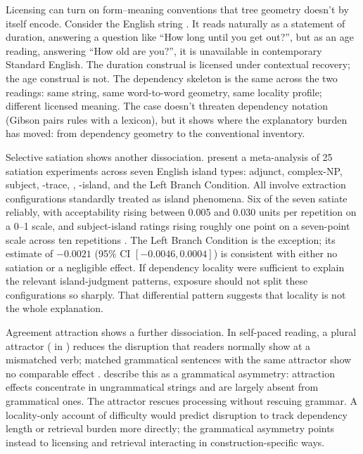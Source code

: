 \documentclass[12pt]{article}
\begin{document}
Licensing can turn on form--meaning conventions that tree geometry doesn't by itself encode.
Consider the English string .
It reads naturally as a statement of duration, answering a question like \enquote{How long until you get out?}, but as an age reading, answering \enquote{How old are you?}, it is unavailable in contemporary Standard English.
The duration construal is licensed under contextual recovery; the age construal is not.
The dependency skeleton is the same across the two readings: same string, same word-to-word geometry, same locality profile; different licensed meaning.
The case doesn't threaten dependency notation (Gibson pairs rules with a lexicon), but it shows where the explanatory burden has moved: from dependency geometry to the conventional inventory.

Selective satiation shows another dissociation.
\textcite{Lu2024} present a meta-analysis of 25 satiation experiments across seven English island types: adjunct, complex-NP, subject, -trace, , -island, and the Left Branch Condition.
All involve extraction configurations standardly treated as island phenomena.
Six of the seven satiate reliably, with acceptability rising between 0.005 and 0.030 units per repetition on a 0--1 scale, and subject-island ratings rising roughly one point on a seven-point scale across ten repetitions \citep[14]{Lu2024}.
The Left Branch Condition is the exception; its estimate of $-0.0021$ (95\% CI $[-0.0046, 0.0004]$) is consistent with either no satiation or a negligible effect.
If dependency locality were sufficient to explain the relevant island-judgment patterns, exposure should not split these configurations so sharply.
That differential pattern suggests that locality is not the whole explanation.

Agreement attraction shows a further dissociation.
In self-paced reading, a plural attractor ( in ) reduces the disruption that readers normally show at a mismatched verb; matched grammatical sentences with the same attractor show no comparable effect \citep{Wagers2009}.
\textcite{phillips2011grammatical} describe this as a grammatical asymmetry: attraction effects concentrate in ungrammatical strings and are largely absent from grammatical ones.
The attractor rescues processing without rescuing grammar.
A locality-only account of difficulty would predict disruption to track dependency length or retrieval burden more directly; the grammatical asymmetry points instead to licensing and retrieval interacting in construction-specific ways.
\end{document}
